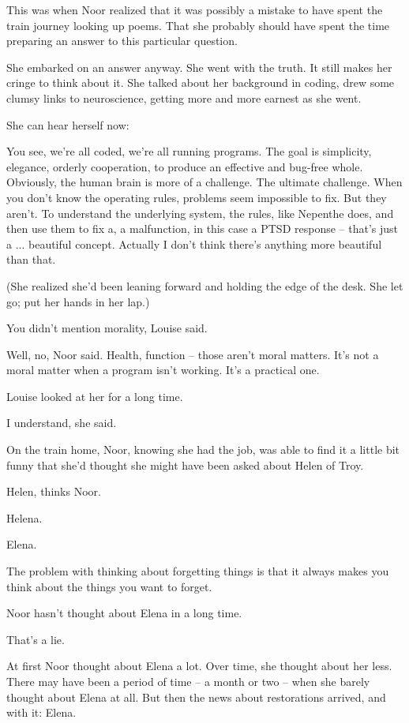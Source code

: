 \documentclass[12pt,a5paper]{book}
\begin{document}
This was when Noor realized that it was possibly a mistake to have spent the train journey looking up poems. That she probably should have spent the time preparing an answer to this particular question.

She embarked on an answer anyway. She went with the truth. It still makes her cringe to think about it. She talked about her background in coding, drew some clumsy links to neuroscience, getting more and more earnest as she went.

She can hear herself now:

You see, we're all coded, we're all running programs. The goal is simplicity, elegance, orderly cooperation, to produce an effective and bug-free whole. Obviously, the human brain is more of a challenge. The ultimate challenge. When you don't know the operating rules, problems seem impossible to fix. But they aren't. To understand the underlying system, the rules, like Nepenthe does, and then use them to fix a, a malfunction, in this case a PTSD response – that's just a ... beautiful concept. Actually I don't think there's anything more beautiful than that.

(She realized she'd been leaning forward and holding the edge of the desk. She let go; put her hands in her lap.)

You didn't mention morality, Louise said.

Well, no, Noor said. Health, function – those aren't moral matters. It's not a moral matter when a program isn't working. It's a practical one.

Louise looked at her for a long time.

I understand, she said.

On the train home, Noor, knowing she had the job, was able to find it a little bit funny that she'd thought she might have been asked about Helen of Troy.

Helen, thinks Noor.

Helena.

Elena.

The problem with thinking about forgetting things is that it always makes you think about the things you want to forget.

Noor hasn't thought about Elena in a long time.

That's a lie.

At first Noor thought about Elena a lot. Over time, she thought about her less. There may have been a period of time – a month or two – when she barely thought about Elena at all. But then the news about restorations arrived, and with it: Elena.
\end{document}
